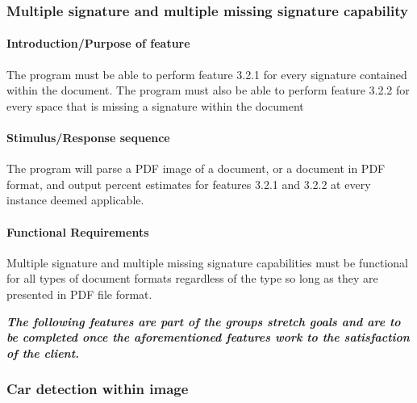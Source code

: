 \documentclass[onecolumn, draftclsnofoot,10pt, compsoc]{IEEEtran}
\begin{document}
\subsubsection{Multiple signature and multiple missing signature capability}\vspace{.5cm}

\hfill\begin{minipage}{\dimexpr\textwidth-2cm}
\paragraph{Introduction/Purpose of feature}
The program must be able to perform feature 3.2.1 for every signature contained within the document. The program must also be able to perform feature 3.2.2 for every space that is missing a signature within the document
\paragraph{Stimulus/Response sequence}
The program will parse a PDF image of a document, or a document in PDF format, and output percent estimates for features 3.2.1 and 3.2.2 at every instance deemed applicable. 
\paragraph{Functional Requirements}
Multiple signature and multiple missing signature capabilities must be functional for all types of document formats regardless of the type so long as they are presented in PDF file format.
\end{minipage}

\vspace{.75cm}
\textbf{\textit{The following features are part of the groups stretch goals and are to be completed once the aforementioned features work to the satisfaction of the client. 
}}
\vspace{.75cm}


\subsubsection{Car detection within image}\vspace{.5cm}
\end{document}
